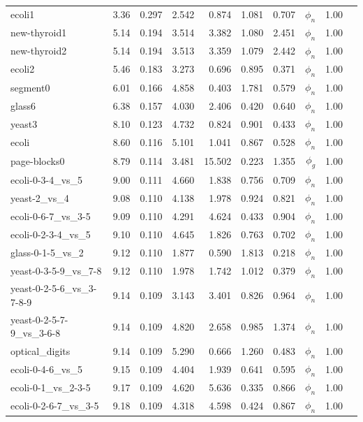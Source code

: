 \begin{longtable}{lrrrrrrrll}
    ecoli1 & 3.36 & 0.297 & 2.542 & 0.874 & 1.081 & 0.707 & $\phi_{n}$ & 1.00 \\
    new-thyroid1 & 5.14 & 0.194 & 3.514 & 3.382 & 1.080 & 2.451 & $\phi_{n}$ & 1.00 \\
    new-thyroid2 & 5.14 & 0.194 & 3.513 & 3.359 & 1.079 & 2.442 & $\phi_{n}$ & 1.00 \\
    ecoli2 & 5.46 & 0.183 & 3.273 & 0.696 & 0.895 & 0.371 & $\phi_{n}$ & 1.00 \\
    segment0 & 6.01 & 0.166 & 4.858 & 0.403 & 1.781 & 0.579 & $\phi_{n}$ & 1.00 \\
    glass6 & 6.38 & 0.157 & 4.030 & 2.406 & 0.420 & 0.640 & $\phi_{n}$ & 1.00 \\
    yeast3 & 8.10 & 0.123 & 4.732 & 0.824 & 0.901 & 0.433 & $\phi_{n}$ & 1.00 \\
    ecoli & 8.60 & 0.116 & 5.101 & 1.041 & 0.867 & 0.528 & $\phi_{n}$ & 1.00 \\
    page-blocks0 & 8.79 & 0.114 & 3.481 & 15.502 & 0.223 & 1.355 & $\phi_{g}$ & 1.00 \\
    ecoli-0-3-4\_vs\_5 & 9.00 & 0.111 & 4.660 & 1.838 & 0.756 & 0.709 & $\phi_{n}$ & 1.00 \\
    yeast-2\_vs\_4 & 9.08 & 0.110 & 4.138 & 1.978 & 0.924 & 0.821 & $\phi_{n}$ & 1.00 \\
    ecoli-0-6-7\_vs\_3-5 & 9.09 & 0.110 & 4.291 & 4.624 & 0.433 & 0.904 & $\phi_{n}$ & 1.00 \\
    ecoli-0-2-3-4\_vs\_5 & 9.10 & 0.110 & 4.645 & 1.826 & 0.763 & 0.702 & $\phi_{n}$ & 1.00 \\
    glass-0-1-5\_vs\_2 & 9.12 & 0.110 & 1.877 & 0.590 & 1.813 & 0.218 & $\phi_{n}$ & 1.00 \\
    yeast-0-3-5-9\_vs\_7-8 & 9.12 & 0.110 & 1.978 & 1.742 & 1.012 & 0.379 & $\phi_{n}$ & 1.00 \\
    yeast-0-2-5-6\_vs\_3-7-8-9 & 9.14 & 0.109 & 3.143 & 3.401 & 0.826 & 0.964 & $\phi_{n}$ & 1.00 \\
    yeast-0-2-5-7-9\_vs\_3-6-8 & 9.14 & 0.109 & 4.820 & 2.658 & 0.985 & 1.374 & $\phi_{n}$ & 1.00 \\
    optical\_digits & 9.14 & 0.109 & 5.290 & 0.666 & 1.260 & 0.483 & $\phi_{n}$ & 1.00 \\
    ecoli-0-4-6\_vs\_5 & 9.15 & 0.109 & 4.404 & 1.939 & 0.641 & 0.595 & $\phi_{n}$ & 1.00 \\
    ecoli-0-1\_vs\_2-3-5 & 9.17 & 0.109 & 4.620 & 5.636 & 0.335 & 0.866 & $\phi_{n}$ & 1.00 \\
    ecoli-0-2-6-7\_vs\_3-5 & 9.18 & 0.109 & 4.318 & 4.598 & 0.424 & 0.867 & $\phi_{n}$ & 1.00 \\

\end{longtable}

